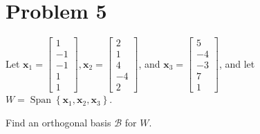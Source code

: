 \documentclass[letter,11pt]{article}
\theoremstyle{definition}
\begin{document}
\section{Problem 5}
Let $\boldsymbol{x}_{1}=\begin{bmatrix}1 \\ -1 \\ -1 \\ 1 \\ 1\end{bmatrix}, \boldsymbol{x}_{2}=\begin{bmatrix}2 \\ 1 \\ 4 \\ -4 \\ 2\end{bmatrix}$, and $\boldsymbol{x}_{3}=\begin{bmatrix}5 \\ -4 \\ -3 \\ 7 \\ 1\end{bmatrix}$, and let $W=\operatorname{Span}\left\{\boldsymbol{x}_{1}, \boldsymbol{x}_{2}, \boldsymbol{x}_{3}\right\}$.

Find an orthogonal basis $\mathcal{B}$ for $W$.
\end{document}
